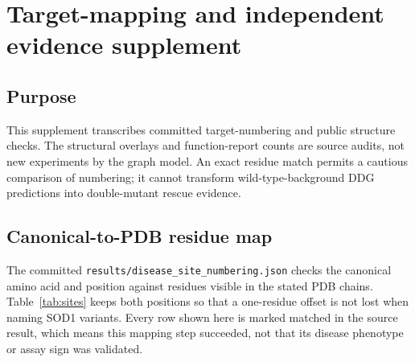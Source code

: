 \clearpage
\section{Target-mapping and independent evidence supplement}
\subsection{Purpose}
This supplement transcribes committed target-numbering and public structure checks. The structural overlays and function-report counts are source audits, not new experiments by the graph model. An exact residue match permits a cautious comparison of numbering; it cannot transform wild-type-background DDG predictions into double-mutant rescue evidence.
\subsection{Canonical-to-PDB residue map}
The committed \texttt{results/disease\_site\_numbering.json} checks the canonical amino acid and position against residues visible in the stated PDB chains. Table~\ref{tab:sites} keeps both positions so that a one-residue offset is not lost when naming SOD1 variants. Every row shown here is marked matched in the source result, which means this mapping step succeeded, not that its disease phenotype or assay sign was validated.
